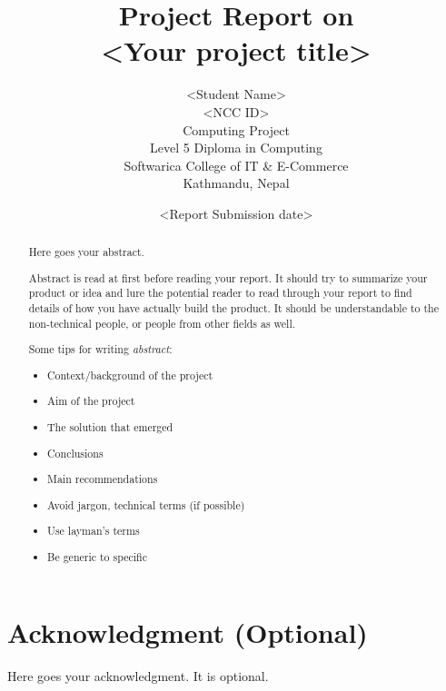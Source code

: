 \documentclass[12pt, a4paper]{report}
\begin{document}
\title{Project Report on\\
\bf{\textless Your project title\textgreater}}
\author{\textless Student Name\textgreater\\
\textless NCC ID\textgreater\\
Computing Project \\
Level 5 Diploma in Computing \\
Softwarica College of IT \& E-Commerce \\
Kathmandu, Nepal
}
\date{\textless Report Submission date\textgreater}


\maketitle



\begin{abstract}
Here goes your abstract.

Abstract is read at first before reading your report. It should try to summarize your product or idea and lure the potential reader to read through your report to find details of how you have actually build the product. It should be understandable to the non-technical people, or people from other fields as well.

Some tips for writing \emph{abstract}:
\begin{itemize}
  \item Context/background of the project
  \item Aim of the project
  \item The solution that emerged
  \item Conclusions
  \item Main recommendations
  \item Avoid jargon, technical terms (if possible)
  \item Use layman's terms
  \item Be generic to specific
\end{itemize}
\end{abstract}

\tableofcontents
\listoftables
\listoffigures


\chapter*{Acknowledgment (Optional)} %
\label{cha:acknowledgment}
Here goes your acknowledgment. It is optional.
\clearpage
{}
\end{document}
